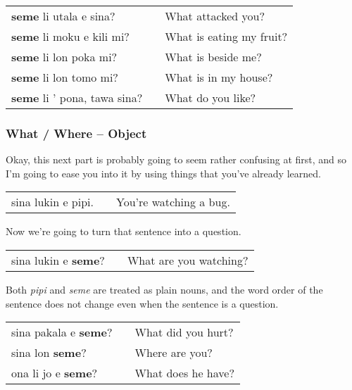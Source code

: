 \begin{supertabular}{p{5,5cm}|ll}
\textbf{seme} li utala e sina? && What attacked you? \\
\textbf{seme} li moku e kili mi? && What is eating my fruit? \\
\textbf{seme} li lon poka mi? && What is beside me? \\
\textbf{seme} li lon tomo mi? && What is in my house? \\
\textbf{seme} li ' pona, tawa sina? && What do you like? \\ 
\end{supertabular} 
%
\subsubsection*{What / Where -- Object}
%
Okay, this next part is probably going to seem rather confusing at first, and so I'm going to ease you into it by using things that you've already learned. 

\begin{supertabular}{p{5,5cm}|ll}
sina lukin e pipi. && You're watching a bug. \\
\end{supertabular} 

Now we're going to turn that sentence into a question. 

\begin{supertabular}{p{5,5cm}|ll}
sina lukin e \textbf{seme}? && What are you watching? \\
\end{supertabular} 

Both \textit{pipi} and \textit{seme} are treated as plain nouns, and the word order of the sentence does not change even when the sentence is a question. 

\begin{supertabular}{p{5,5cm}|ll}
sina pakala e \textbf{seme}? && What did you hurt? \\
sina lon \textbf{seme}? && Where are you? \\ 
ona li jo e \textbf{seme}? && What does he have? \\
\end{supertabular} 
%
